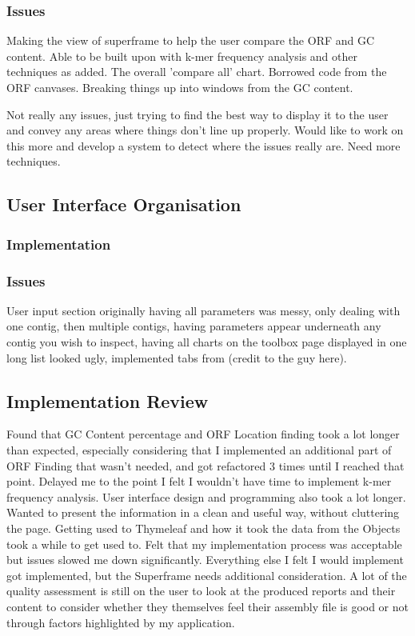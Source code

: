 \subsubsection{Issues}
Making the view of superframe to help the user compare the ORF and GC content. Able to be built upon with k-mer frequency analysis and other techniques as added. The overall 'compare all' chart. Borrowed code from the ORF canvases. Breaking things up into windows from the GC content.

Not really any issues, just trying to find the best way to display it to the user and convey any areas where things don't line up properly. Would like to work on this more and develop a system to detect where the issues really are. Need more techniques.

\subsection{User Interface Organisation}
\subsubsection{Implementation}
\subsubsection{Issues}
User input section originally having all parameters was messy, only dealing with one contig, then multiple contigs, having parameters appear underneath any contig you wish to inspect, having all charts on the toolbox page displayed in one long list looked ugly, implemented tabs from (credit to the guy here).

\subsection{Implementation Review}
Found that GC Content percentage and ORF Location finding took a lot longer than expected, especially considering that I implemented an additional part of ORF Finding that wasn't needed, and got refactored 3 times until I reached that point. Delayed me to the point I felt I wouldn't have time to implement k-mer frequency analysis. 
User interface design and programming also took a lot longer. Wanted to present the information in a clean and useful way, without cluttering the page. Getting used to Thymeleaf and how it took the data from the Objects took a while to get used to. Felt that my implementation process was acceptable but issues slowed me down significantly. Everything else I felt I would implement got implemented, but the Superframe needs additional consideration. A lot of the quality assessment is still on the user to look at the produced reports and their content to consider whether they themselves feel their assembly file is good or not through factors highlighted by my application.


